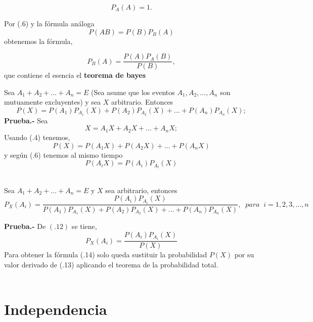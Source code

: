 \begin{equation}
    P_A(A)=1.
\end{equation}

Por (.6) y la fórmula análoga $$P(AB)=P(B)P_B(A)$$
obtenemos la fórmula,

\begin{tcolorbox}[colframe=white]
    \begin{equation}
	P_B(A) = \dfrac{P(A)P_A(B)}{P(B)},
    \end{equation}
    que contiene el esencia el \textbf{teorema de bayes}
\end{tcolorbox}

    \begin{teo} Sea $A_1+A_2+\ldots + A_n = E$ (Sea asume que los eventos $A_1,A_2,\ldots,A_n$ son mutuamente excluyentes) y sea $X$ arbitrario. Entonces 
	\begin{equation}
	    P(X)=P(A_1)P_{A_1}(X) + P(A_2)P_{A_2}(X)+\ldots + P(A_n)P_{A_n}(X);
	\end{equation}
	\vspace{.5cm}
	\textbf{Prueba.-}\; Sea $$X=A_1 X + A_2X + \ldots + A_n X;$$
Usando (.4) tenemos, $$P(X)=P(A_1X)+P(A_2X)+\ldots + P(A_nX)$$
y según (.6) tenemos al mismo tiempo
$$P(A_iX)=P(A_i)P_{A_t}(X)$$\\
    \end{teo}

    \begin{teo}
	Sea $A_1+A_2+\ldots + A_n = E$ y $X$ sea arbitrario, entonces 
	\begin{equation}
	    P_X(A_i) = \dfrac{P(A_i)P_{A_i}(X)}{P(A_1)P_{A_1}(X) + P(A_2)P_{A_2}(X)+\ldots + P(A_n)P_{A_n}(X)}, \; \; para \;\; i=1,2,3,\ldots,n 
	\end{equation}

	\vspace{.5cm}

	\textbf{Prueba.-}\; De $(.12)$ se tiene, $$P_X(A_i) = \dfrac{P(A_i) P_{A_i}(X)}{P(X)}$$
	Para obtener la fórmula (.14) solo queda sustituir la probabilidad $P(X)$ por su valor derivado de (.13) aplicando el teorema de la probabilidad total.\\\\
    \end{teo}

\section{Independencia}

